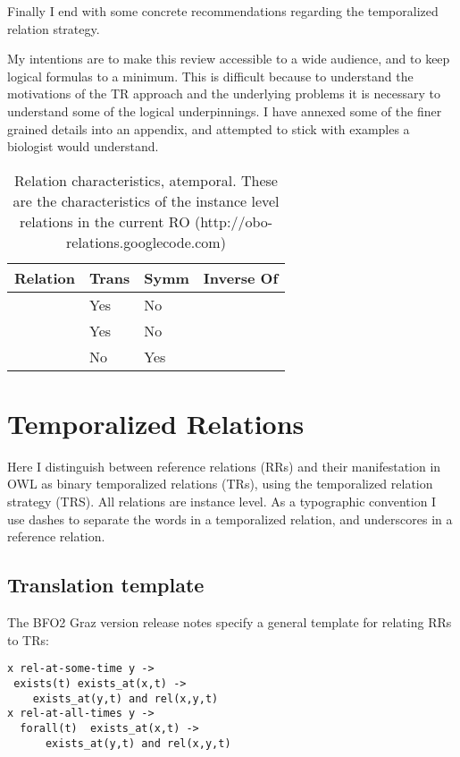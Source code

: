 \documentclass{bioinfo}
\def\partOf{\pr{part\_of}}
\def\hasPart{\pr{has\_part}}
\def\adjacentTo{\pr{adjacent\_to}}
\begin{document}
Finally I end with some concrete recommendations regarding the
temporalized relation strategy.

My intentions are to make this review accessible to a wide audience,
and to keep logical formulas to a minimum. This is difficult because
to understand the motivations of the TR approach and the underlying
problems it is necessary to understand some of the logical
underpinnings. I have annexed some of the finer grained details into
an appendix, and attempted to stick with examples a biologist would
understand.

\begin{table}
\begin{tabular}{ | p{2.5cm} | p{1cm} | p{1cm} | p{2.5cm} | }
\hline
\textbf{Relation} & \textbf{Trans} & \textbf{Symm} & \textbf{Inverse Of}  \\
\hline
\partOf\  & Yes & No & \hasPart  \\
\hline
\hasPart\ & Yes & No & \partOf \\
\hline
\adjacentTo\ & No & Yes &  \\
\hline
\end{tabular}
\caption{Relation characteristics, atemporal. These are the characteristics of the instance level relations in the current RO (http://obo-relations.googlecode.com)}
\label{tab:characteristics-atemporal}
\end{table}


\section{Temporalized Relations}

Here I distinguish between reference relations (RRs) and their
manifestation in OWL as binary temporalized relations (TRs), using the
temporalized relation strategy (TRS). All relations are instance
level. As a typographic convention I use dashes to separate the words
in a temporalized relation, and underscores in a reference relation.

\subsection{Translation template}

The BFO2 Graz version release notes\cite{Graz} specify a general
template for relating RRs to TRs:

\begin{verbatim}
x rel-at-some-time y ->
 exists(t) exists_at(x,t) -> 
    exists_at(y,t) and rel(x,y,t)
x rel-at-all-times y ->
  forall(t)  exists_at(x,t) -> 
      exists_at(y,t) and rel(x,y,t)
\end{verbatim}
\end{document}
